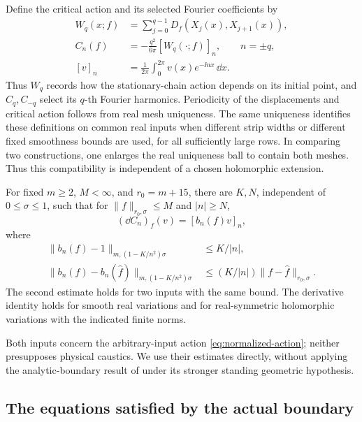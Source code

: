 Define the critical action and its selected Fourier coefficients by
\begin{equation}\label{ana:constraints}
\begin{split}
 W_q(x;f)&=\sum_{j=0}^{q-1}D_f(X_j(x),X_{j+1}(x)),\\
 C_n(f)&=-\frac{q^2}{6\pi}[W_q(\cdot;f)]_n,
 \qquad n=\pm q,\\
 [v]_n&=\frac1{2\pi}\int_0^{2\pi}v(x)e^{-\ii nx}\,\dd x.
\end{split}
\end{equation}
Thus \(W_q\) records how the stationary-chain action depends on its
initial point, and \(C_q,C_{-q}\) select its \(q\)-th Fourier harmonics.
Periodicity of the displacements and critical action follows from real
mesh uniqueness.  The same
uniqueness identifies these definitions on common real inputs when
different strip widths or different fixed smoothness bounds are used,
for all sufficiently large rows.  In comparing two constructions, one
enlarges the real uniqueness ball to contain both meshes.  Thus this
compatibility is independent of a chosen holomorphic extension.

\begin{proposition}
\label{prop:row-input}
For fixed \(m\ge2\), \(M<\infty\), and \(r_0=m+15\), there are
\(K,N\), independent of \(0\le\sigma\le1\), such that for
\(\|f\|_{r_0,\sigma}\le M\) and \(|n|\ge N\),
\begin{equation}\label{ana:row-derivative}
 (\dd C_n)_f(v)=[b_n(f)v]_n,
\end{equation}
where
\begin{align}
 \|b_n(f)-1\|_{m,(1-K/n^2)\sigma}&\le K/|n|,
 \label{ana:row-bound}\\
 \|b_n(f)-b_n(\widehat f)\|_{m,(1-K/n^2)\sigma}
 &\le (K/|n|)\|f-\widehat f\|_{r_0,\sigma}.
 \label{ana:row-difference}
\end{align}
The second estimate holds for two inputs with the same bound.
The derivative identity holds for smooth real variations and for
real-symmetric holomorphic variations with the indicated finite norms.
\end{proposition}

Both inputs concern the arbitrary-input action
\eqref{eq:normalized-action}; neither presupposes physical caustics.
We use their estimates directly, without applying the analytic-boundary
result of \cite{NB} under its stronger standing geometric hypothesis.

\subsection{The equations satisfied by the actual boundary}


